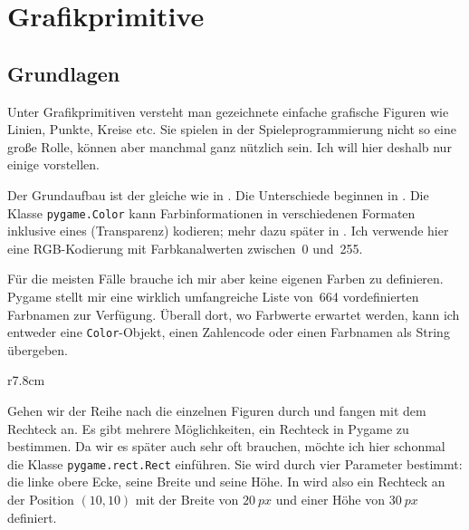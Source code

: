 \newpage
\section{Grafikprimitive}
\subsection{Grundlagen}
Unter Grafikprimitiven versteht man gezeichnete einfache grafische Figuren wie Linien, Punkte, Kreise etc. Sie spielen in der Spieleprogrammierung nicht so eine große Rolle, können aber manchmal ganz nützlich sein. Ich will hier deshalb nur einige vorstellen. 


Der Grundaufbau ist der gleiche wie in . Die Unterschiede beginnen in . Die Klasse \texttt{pygame.Color} kann Farbinformationen in verschiedenen Formaten inklusive eines  (Transparenz) kodieren; mehr dazu später in . Ich verwende hier eine RGB-Kodierung mit Farbkanalwerten zwischen~0 und~255. 

Für die meisten Fälle brauche ich mir aber keine eigenen Farben zu definieren. Pygame stellt mir eine wirklich umfangreiche Liste von~664 vordefinierten Farbnamen zur Verfügung. Überall dort, wo Farbwerte erwartet werden, kann ich entweder eine \texttt{Color}-Objekt, einen Zahlencode oder einen Farbnamen als String übergeben.

\begin{wrapfigure}[18]{r}{7.8cm}%
	\begin{center}%
		\vspace{-1cm}%
	\end{center}%
\end{wrapfigure}%
Gehen wir der Reihe nach die einzelnen Figuren durch und fangen mit dem Rechteck an. Es gibt mehrere Möglichkeiten, ein Rechteck in Pygame zu bestimmen. Da wir es später auch sehr oft brauchen, möchte ich hier schonmal die Klasse \texttt{pygame.rect.Rect} einführen. Sie wird durch vier Parameter bestimmt: die linke obere Ecke, seine Breite und seine Höhe. In  wird also ein Rechteck an der Position $(10,10)$ mit der Breite von $20~px$ und einer Höhe von $30~px$ definiert. 

